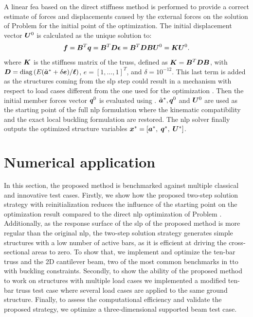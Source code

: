 A linear \gls{fea} based on the direct stiffness method is performed to provide a correct estimate of forces and displacements caused by the external forces on the solution of Problem  for the initial point of the optimization. The initial displacement vector $\bm{U}^0$ is calculated as the unique solution to:
\begin{equation}
    \bm{f}=\bm{B}^T \bm{q}=\bm{B}^{T} \bm{D} \bm{\epsilon}=\bm{B}^{T} \bm{D} \bm{B} \bm{U}^0=\bm{K} \bm{U}^0.
    \label{eq:04_truss_fem}
\end{equation} 
 where $\bm{K}$ is the stiffness matrix of the truss, defined as $\bm{K}=\bm{B}^{T} \bm{D} \bm{B}$, with $\bm{D}=\operatorname{diag}\left(E (\tilde{\bm{a}}^* + \delta \bm{e}) / \bm{\ell}\right)$, $e =[1,\dots,1]^T$, and $\delta =10^{-12}$. This last term is added as the structures coming from the \gls{slp} step could result in a mechanism with respect to load cases different from the one used for the optimization . Then the initial member forces vector $\bm{q}^0$ is evaluated using . $\tilde{\bm{a}}^*, \bm{q}^0$ and $\bm{U}^0$ are used as the starting point of the full \gls{nlp} formulation where the kinematic compatibility and the exact local buckling formulation are restored. The \gls{nlp} solver finally outputs the optimized structure variables $\bm{x}^*=[\bm{a}^*,\; \bm{q}^*,\; \bm{U}^*]$.

\section{Numerical application} \label{sec:04_numerical_app}
In this section, the proposed method is benchmarked against multiple classical and innovative test cases. Firstly, we show how the proposed two-step solution strategy with reinitialization reduces the influence of the starting point on the optimization result compared to the direct \gls{nlp} optimization of Problem . Additionally, as the response surface of the \gls{slp} of the proposed method is more regular than the original \gls{nlp}, the two-step solution strategy generates simple structures \ie with a low number of active bars, as it is efficient at driving the cross-sectional areas to zero. To show that, we implement and optimize the ten-bar truss and the 2D cantilever beam, two of the most common benchmarks in \gls{tto} with buckling constraints. Secondly, to show the ability of the proposed method to work on structures with multiple load cases we implemented a modified ten-bar truss test case where several load cases are applied to the same ground structure. Finally, to assess the computational efficiency and validate the proposed strategy, we optimize a three-dimensional supported beam test case.

